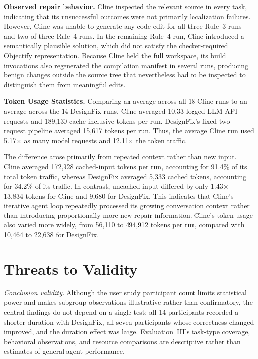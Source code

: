 \textbf{Observed repair behavior.}
Cline inspected the relevant source in every task, indicating that
its unsuccessful outcomes were not primarily localization failures.
However, Cline was unable to generate any code edit for all three Rule~3 runs and two
of three Rule~4 runs. In the remaining
Rule~4 run, Cline introduced a semantically plausible solution, which did not satisfy the  checker-required Objectify representation. Because Cline held the full workspace, its build invocations also regenerated the compilation manifest in several runs, producing benign changes outside the source tree that nevertheless had to be inspected to distinguish them from meaningful edits.




\textbf{Token Usage Statistics.}
Comparing an average across all 18 Cline runs to an average across the 14 DesignFix
runs, Cline averaged 10.33 logged LLM API requests and
189,130 cache-inclusive tokens per run. DesignFix's fixed two-request pipeline averaged 15,617 tokens per run. Thus, the
average Cline run used 5.17$\times$ as many model requests and
12.11$\times$ the token traffic.

The difference arose primarily from repeated context rather than new
input. Cline averaged 172,928 cached-input tokens per run, accounting
for 91.4\% of its total token traffic, whereas DesignFix averaged 5,333
cached tokens, accounting for 34.2\% of its traffic. In contrast,
uncached input differed by only 1.43$\times$---13,834 tokens for Cline
and 9,680 for DesignFix. This indicates that Cline's iterative agent
loop repeatedly processed its growing conversation context rather than
introducing proportionally more new repair information. Cline's token usage also varied more widely, from
56,110 to 494,912 tokens per run, compared with 10,464 to 22,638 for DesignFix.



\section{Threats to Validity}
\label{sec:threats}

\textit{Conclusion validity.}
Although the user study participant count limits statistical power and
makes subgroup observations illustrative rather than confirmatory, the
central findings do not depend on a single test: all 14 participants
recorded a shorter duration with DesignFix, all seven participants whose
correctness changed improved, and the duration effect was large.
Evaluation~III's task-type coverage, behavioral observations, and resource
comparisons are descriptive rather than estimates of general agent
performance.

